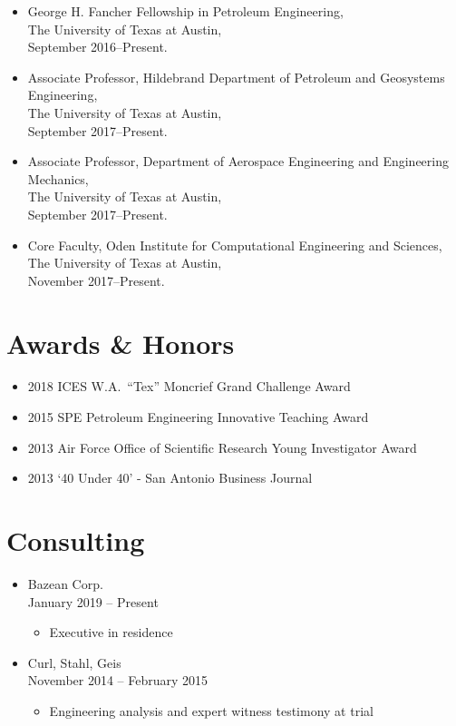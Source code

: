 \begin{itemize}
    \item George H. Fancher Fellowship in Petroleum Engineering, \\ 
          The University of Texas at Austin, \\
          September 2016--Present. 

    \item Associate Professor, Hildebrand Department of Petroleum and Geosystems Engineering, \\ 
          The University of Texas at Austin, \\
          September 2017--Present. 

      \item Associate Professor, Department of Aerospace Engineering and Engineering Mechanics, \\ 
          The University of Texas at Austin, \\
          September 2017--Present. 

    \item Core Faculty, Oden Institute for Computational Engineering and Sciences, \\ 
          The University of Texas at Austin, \\
          November 2017--Present. 
\end{itemize}
\fi

\section*{Awards \& Honors}

\begin{itemize}
    \item 2018 ICES W.A.\ ``Tex'' Moncrief Grand Challenge Award
    \item 2015 SPE Petroleum Engineering Innovative Teaching Award 
    \item 2013 Air Force Office of Scientific Research Young Investigator Award
    \item 2013 `40 Under 40' - San Antonio Business Journal
\end{itemize}


\ifdefined\ispdf
\section*{Consulting}

\begin{itemize}
    \item Bazean Corp. \\
          January 2019 -- Present
    \begin{itemize}
        \item Executive in residence
    \end{itemize}
    \item Curl, Stahl, Geis \\
          November 2014 -- February 2015
    \begin{itemize}
        \item Engineering analysis and expert witness testimony at trial
    \end{itemize}
\end{itemize}
\fi
\fi

